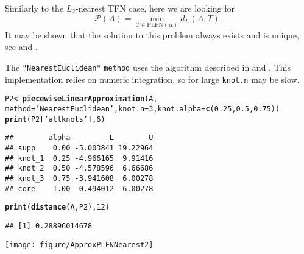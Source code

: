 \documentclass[11pt]{article}\usepackage[]{graphicx}\usepackage[]{color}
\makeatletter
\newcommand{\hlnum}[1]{\textcolor[rgb]{0.686,0.059,0.569}{#1}}%
\newcommand{\hlstr}[1]{\textcolor[rgb]{0.192,0.494,0.8}{#1}}%
\newcommand{\hlstd}[1]{\textcolor[rgb]{0.345,0.345,0.345}{#1}}%
\newcommand{\hlkwb}[1]{\textcolor[rgb]{0.69,0.353,0.396}{#1}}%
\newcommand{\hlkwc}[1]{\textcolor[rgb]{0.333,0.667,0.333}{#1}}%
\newcommand{\hlkwd}[1]{\textcolor[rgb]{0.737,0.353,0.396}{\textbf{#1}}}%
\newenvironment{kframe}{%
 \def\at@end@of@kframe{}%
 \ifinner\ifhmode%
  \def\at@end@of@kframe{\end{minipage}}%
  \begin{minipage}{\columnwidth}%
 \fi\fi%
 \def\FrameCommand##1{\hskip\@totalleftmargin \hskip-\fboxsep
 \colorbox{shadecolor}{##1}\hskip-\fboxsep
     \hskip-\linewidth \hskip-\@totalleftmargin \hskip\columnwidth}%
 \MakeFramed {\advance\hsize-\width
   \@totalleftmargin\z@ \linewidth\hsize
   \@setminipage}}%
 {\par\unskip\endMakeFramed%
 \at@end@of@kframe}
\newenvironment{knitrout}{}{} %
\newcommand{\argument}[1]{\texttt{\hlkwc{#1}}}
\newcommand{\str}[1]{\texttt{\hlstr{#1}}}
\makeatother
\begin{document}
Similarly to the $L_2$-nearest TFN case, here we are looking for
\[
\mathcal{P}(A)=\min\limits_{T\in \mathrm{PLFN}(\boldsymbol\alpha)}d_E(A,T).
\]
It may be shown that the solution to this problem
always exists and is unique, see \cite{CoroianuETAL2013:piecewise1}
and \cite{CoroianuETALXXXX:piecewise2}.

The \str{"{}NearestEuclidean"{}} \argument{method}
uses the algorithm described in \cite{CoroianuETAL2013:piecewise1}
and \cite{CoroianuETALXXXX:piecewise2}.
This implementation relies on numeric integration, so for large \argument{knot.n}
may be slow.

\begin{knitrout}\small
{}\color{fgcolor}\begin{kframe}
\begin{alltt}
\hlstd{P2} \hlkwb{<-} \hlkwd{piecewiseLinearApproximation}\hlstd{(A,}
   \hlkwc{method}\hlstd{=}\hlstr{'NearestEuclidean'}\hlstd{,} \hlkwc{knot.n}\hlstd{=}\hlnum{3}\hlstd{,} \hlkwc{knot.alpha}\hlstd{=}\hlkwd{c}\hlstd{(}\hlnum{0.25}\hlstd{,}\hlnum{0.5}\hlstd{,}\hlnum{0.75}\hlstd{))}
\hlkwd{print}\hlstd{(P2[}\hlstr{'allknots'}\hlstd{],} \hlnum{6}\hlstd{)}
\end{alltt}
\begin{verbatim}
##        alpha         L        U
## supp    0.00 -5.003841 19.22964
## knot_1  0.25 -4.966165  9.91416
## knot_2  0.50 -4.578596  6.66686
## knot_3  0.75 -3.941608  6.00278
## core    1.00 -0.494012  6.00278
\end{verbatim}
\begin{alltt}
\hlkwd{print}\hlstd{(}\hlkwd{distance}\hlstd{(A, P2),} \hlnum{12}\hlstd{)}
\end{alltt}
\begin{verbatim}
## [1] 0.28896014678
\end{verbatim}
\end{kframe}
\end{knitrout}

\begin{center}
\begin{knitrout}\small
{}\color{fgcolor}

{\centering \texttt{[image: figure/ApproxPLFNNearest2]} 

}



\end{knitrout}
\end{center}
\end{document}
